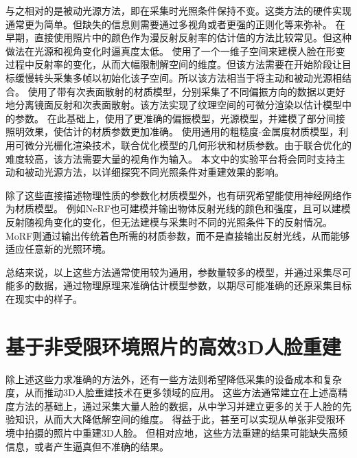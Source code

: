 与之相对的是被动光源方法，即在采集时光照条件保持不变。这类方法的硬件实现通常更为简单。但缺失的信息则需要通过多视角或者更强的正则化等来弥补。
在早期，直接使用照片中的颜色作为漫反射反射率的估计值的方法\citep{PighinHLSS98,BradleyHPS10}比较常见。但这种做法在光源和视角变化时逼真度太低。
\citet{GotardoRBGB18}使用了一个一维子空间来建模人脸在形变过程中反射率的变化，从而大幅限制解空间的维度。但该方法需要在开始阶段让目标缓慢转头采集多帧以初始化该子空间。所以该方法相当于将主动和被动光源相结合。
\citet{RiviereGBGB20}使用了带有次表面散射的材质模型，分别采集了不同偏振方向的数据以更好地分离镜面反射和次表面散射。该方法实现了纹理空间的可微分渲染以估计模型中的参数。
在此基础上，\citet{XuRZCBG22}使用了更准确的偏振模型，光源模型，并建模了部分间接照明效果，使估计的材质参数更加准确。
\citet{nvdiffrec}使用通用的粗糙度-金属度材质模型，利用可微分光栅化渲染技术，联合优化模型的几何形状和材质参数。由于联合优化的难度较高，该方法需要大量的视角作为输入。
本文中的实验平台将会同时支持主动和被动光源方法，以详细探究不同光照条件对重建效果的影响。

除了这些直接描述物理性质的参数化材质模型外，也有研究希望能使用神经网络作为材质模型。
例如NeRF\citep{nerf}也可建模并输出物体反射光线的颜色和强度，且可以建模反射随视角变化的变化，但无法建模与采集时不同的光照条件下的反射情况。
MoRF\citep{MoRF}则通过输出传统着色所需的材质参数，而不是直接输出反射光线，从而能够适应任意新的光照环境。

总结来说，以上这些方法通常使用较为通用，参数量较多的模型，并通过采集尽可能多的数据，通过物理原理来准确估计模型参数，以期尽可能准确的还原采集目标在现实中的样子。

\section{基于非受限环境照片的高效3D人脸重建}

除上述这些力求准确的方法外，还有一些方法则希望降低采集的设备成本和复杂度，从而推动3D人脸重建技术在更多领域的应用。
这些方法通常建立在上述高精度方法的基础上，通过采集大量人脸的数据，从中学习并建立更多的关于人脸的先验知识，从而大大降低解空间的维度。
得益于此，甚至可以实现从单张非受限环境中拍摄的照片中重建3D人脸。
但相对应地，这些方法重建的结果可能缺失高频信息，或者产生逼真但不准确的结果。

